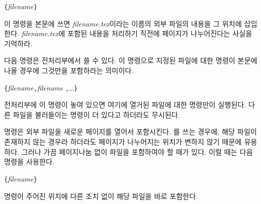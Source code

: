 \begin{lscommand}
\verb|{|\emph{filename}\verb|}|
\end{lscommand}
\noindent 이 명령을 본문에 쓰면 \emph{filename.tex}이라는 이름의 외부 파일의 내용을 
그 위치에 삽입한다. \emph{filename.tex}에 포함된 내용을 처리하기 직전에 
페이지가 나누어진다는 사실을 기억하라.

다음 명령은 전처리부에서 쓸 수 있다. 이 명령으로 지정된 파일에 대한 
\verb|| 명령이 본문에 나올 경우에 그것만을 포함하라는 의미이다.
\begin{lscommand}
\verb|{|\emph{filename}\verb|,|\emph{filename}%
\verb|,|\ldots\verb|}|
\end{lscommand}
\noindent 전처리부에 이 명령이 놓여 있으면 여기에 열거된 파일에 대한 
\verb|| 명령만이 실행된다. 다른 파일을 불러들이는 \verb|| 명령이 더 있다고 
하더라도 무시된다. 

 명령은 외부 파일을 새로운 페이지를 열어서 포함시킨다. 를 
쓰는 경우에, 해당 파일이 존재하지 않는 경우라 하더라도 페이지가 나누어지는 위치가 변하지 않기 때문에 유용하다. 
그러나 가끔 페이지나눔 없이 파일을 포함하여야 할 때가 있다. 이럴 때는 다음 명령을 사용한다.
\begin{lscommand}
\verb|{|\emph{filename}\verb|}|
\end{lscommand}
\noindent 명령이 주어진 위치에 다른 조치 없이 해당 파일을 바로 포함한다.

